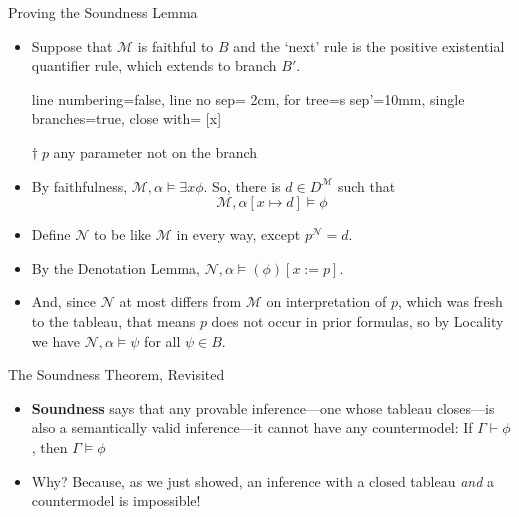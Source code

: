 \begin{frame}{Proving the Soundness Lemma}

\medskip

	\begin{itemize}
	\itemsep=10pt
	
	\item Suppose that $\mathcal{M}$ is faithful to $B$ and the `next' rule is the positive existential quantifier rule, which extends to branch $B'$.

	\begin{center}

			\begin{prooftree}
			{
			line numbering=false,
			line no sep= 2cm,
			for tree={s sep'=10mm},
			single branches=true,
			close with=\xmark
			}
			[\exists x\phi [\phi\lbrack x:\!{=}\, p\rbrack^\dagger ] ]
			\end{prooftree}

	\bigskip
	$\dagger\; p$ any parameter not on the branch

	\end{center}
	              \item By faithfulness, $\mathcal{M},\alpha\vDash\exists x\phi$. 
              So, there is $d\in D^\mathcal{M}$ such that \[\mathcal{M},\alpha[x\mapsto d]\vDash \phi\]

                  \item Define $\mathcal{N}$ to be like $\mathcal{M}$ in every way, except $p^\mathcal{N}=d$.

                    \item By the Denotation Lemma, 
                      $\mathcal{N},\alpha\vDash (\phi)[x:=p]$.

                      \item And, since $\mathcal{N}$ at most differs from $\mathcal{M}$ on interpretation of $p$, which was fresh to the tableau, that means $p$ does not occur in prior formulas, so by Locality we have $\mathcal{N},\alpha\vDash \psi$ for all $\psi\in B$.
 
  \end{itemize}
  
\end{frame}

\begin{frame}{The Soundness Theorem, Revisited}

	\begin{itemize}%
	\itemsep=16pt

        \item \textbf{Soundness} says that any provable inference---one whose tableau closes---is also a semantically valid inference---it cannot have any countermodel: If $\Gamma\vdash\phi$, then $\Gamma\vDash\phi$
        
        \item Why? Because, as we just showed, an inference with a closed tableau \emph{and} a countermodel is impossible!
        
	\end{itemize}

\end{frame}

